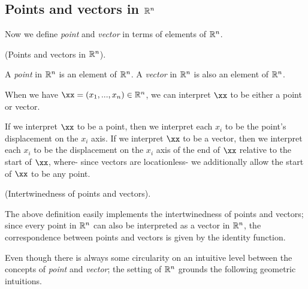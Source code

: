 \subsection*{Points and vectors in $\mathbb{R}^n$}

Now we define \textit{point} and \textit{vector} in terms of elements of $\mathbb{R}^n$.

\begin{defn}
    (Points and vectors in $\mathbb{R}^n$).
    
    A \textit{point} in $\mathbb{R}^n$ is an element of $\mathbb{R}^n$. A \textit{vector} in $\mathbb{R}^n$ is also an element of $\mathbb{R}^n$.
    
    When we have $\xx = (x_1, ..., x_n) \in \R^n$, we can interpret $\xx$ to be either a point or vector. 
    
    If we interpret $\xx$ to be a point, then we interpret each $x_i$ to be the point's displacement on the $x_i$ axis. If we interpret $\xx$ to be a vector, then we interpret each $x_i$ to be the displacement on the $x_i$ axis of the end of $\xx$ relative to the start of $\xx$, where- since vectors are locationless- we additionally allow the start of $\xx$ to be any point.
\end{defn}

\begin{remark}
    (Intertwinedness of points and vectors).
    
    The above definition easily implements the intertwinedness of points and vectors; since every point in $\mathbb{R}^n$ can also be interpreted as a vector in $\mathbb{R}^n$, the correspondence between points and vectors is given by the identity function.
\end{remark}

Even though there is always some circularity on an intuitive level between the concepts of \textit{point} and \textit{vector}; the setting of $\mathbb{R}^n$ grounds the following geometric intuitions.

